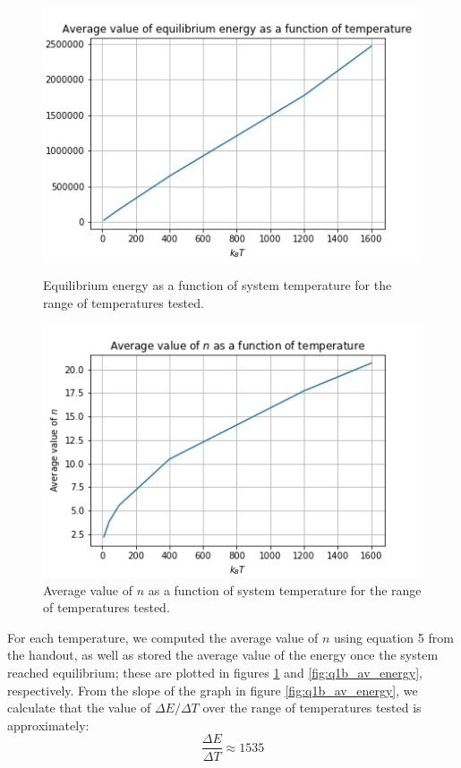 \documentclass{article}
\begin{document}
\begin{figure}[H]
	\centering
	\begin{minipage}{0.49\linewidth}
		\includegraphics[width=\linewidth]{../images/q1b_av_energy.png}
		\caption{Equilibrium energy as a function of system temperature for the range of temperatures tested.}
		\label{fig:q1b_av_energy}
	\end{minipage}
	\begin{minipage}{0.49\linewidth}
		\includegraphics[width=\linewidth]{../images/q1b_av_n.png}
		\caption{Average value of $n$ as a function of system temperature for the range of temperatures tested.}
		\label{fig:q1b_av_n}
	\end{minipage}
\end{figure}

For each temperature, we computed the average value of $n$ using equation 5 from the handout, as well as stored the average value of the energy once the system reached equilibrium; these are plotted in figures \ref{fig:q1b_av_n} and \ref{fig:q1b_av_energy}, respectively. From the slope of the graph in figure \ref{fig:q1b_av_energy}, we calculate that the value of $\Delta E / \Delta T$ over the range of temperatures tested is approximately:
\begin{equation}
	\frac{\Delta E}{\Delta T} \approx 1535
\end{equation}
\end{document}
